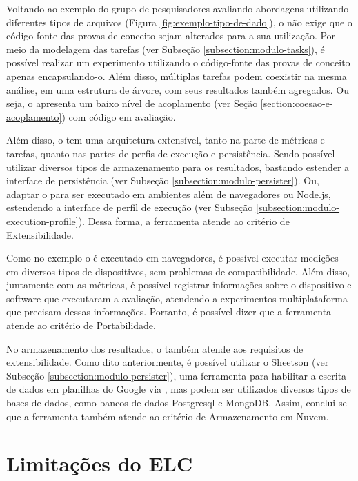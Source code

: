 \documentclass[12pt]{tcc}
\begin{document}
	Voltando ao exemplo do grupo de pesquisadores avaliando abordagens utilizando diferentes tipos de arquivos (Figura \ref{fig:exemplo-tipo-de-dado}), o  não exige que o código fonte das provas de conceito sejam alterados para a sua utilização.
	Por meio da modelagem das tarefas (ver Subseção \ref{subsection:modulo-tasks}), é possível realizar um experimento utilizando o código-fonte das provas de conceito apenas encapsulando-o.
	Além disso, múltiplas tarefas podem coexistir na mesma análise, em uma estrutura de árvore, com seus resultados também agregados.
	Ou seja, o  apresenta um baixo nível de acoplamento (ver Seção \ref{section:coesao-e-acoplamento}) com código em avaliação. 

	Além disso, o  tem uma arquitetura extensível, tanto na parte de métricas e tarefas, quanto nas partes de perfis de execução e persistência.
	Sendo possível utilizar diversos tipos de armazenamento para os resultados, bastando estender a interface de persistência (ver Subseção \ref{subsection:modulo-persister}).
	Ou, adaptar o  para ser executado em ambientes além de navegadores ou Node.js, estendendo a interface de perfil de execução (ver Subseção \ref{subsection:modulo-execution-profile}).
	Dessa forma, a ferramenta atende ao critério de Extensibilidade.

	Como no exemplo o  é executado em navegadores, é possível executar medições em diversos tipos de dispositivos, sem problemas de compatibilidade.
	Além disso, juntamente com as métricas, é possível registrar informações sobre o dispositivo e software que executaram a avaliação, atendendo a experimentos multiplataforma que precisam dessas informações. Portanto, é possível dizer que a ferramenta atende ao critério de Portabilidade.

	No armazenamento dos resultados, o  também atende aos requisitos de extensibilidade.
	Como dito anteriormente, é possível utilizar o Sheetson (ver Subseção \ref{subsection:modulo-persister}), uma ferramenta para habilitar a escrita de dados em planilhas do Google via , mas podem ser utilizados diversos tipos de bases de dados, como bancos de dados Postgresql e MongoDB.
	Assim, conclui-se que a ferramenta também atende ao critério de Armazenamento em Nuvem.


	\section{Limitações do ELC}
	\label{section:limitacoes-elc}
\end{document}
